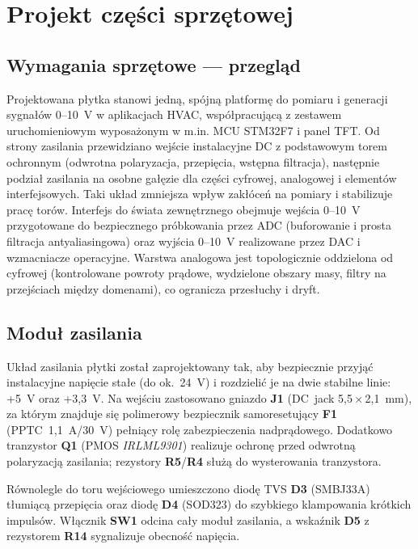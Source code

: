 \section{Projekt części sprzętowej}

\label{sec:wymagania-sprzetowe-przeglad}
\subsection{Wymagania sprzętowe — przegląd}
\label{sec:wymagania-sprzetowe-przeglad}

Projektowana płytka stanowi jedną, spójną platformę do pomiaru i generacji sygnałów 0--10~V w aplikacjach HVAC, współpracującą z zestawem uruchomieniowym wyposażonym w m.in. MCU STM32F7 i panel TFT. Od strony zasilania przewidziano wejście instalacyjne DC z podstawowym torem ochronnym (odwrotna polaryzacja, przepięcia, wstępna filtracja), następnie podział zasilania na osobne gałęzie dla części cyfrowej, analogowej i elementów interfejsowych. Taki układ zmniejsza wpływ zakłóceń na pomiary i stabilizuje pracę torów. Interfejs do świata zewnętrznego obejmuje wejścia 0--10~V przygotowane do bezpiecznego próbkowania przez ADC (buforowanie i prosta filtracja antyaliasingowa) oraz wyjścia 0--10~V realizowane przez DAC i wzmacniacze operacyjne. Warstwa analogowa jest topologicznie oddzielona od cyfrowej (kontrolowane powroty prądowe, wydzielone obszary masy, filtry na przejściach między domenami), co ogranicza przesłuchy i dryft.


\subsection{Moduł zasilania}


Układ zasilania płytki został zaprojektowany tak, aby bezpiecznie przyjąć instalacyjne napięcie stałe (do ok.~24~V) i rozdzielić je na dwie stabilne linie: \mbox{+5~V} oraz \mbox{+3{,}3~V}. Na wejściu zastosowano gniazdo \textbf{J1} (DC~jack 5{,}5\,$\times$\,2{,}1~mm), za którym znajduje się polimerowy bezpiecznik samoresetujący \textbf{F1} (PPTC~1{,}1~A/30~V) pełniący rolę zabezpieczenia nadprądowego. Dodatkowo tranzystor \textbf{Q1} (PMOS \textit{IRLML9301}) realizuje ochronę przed odwrotną polaryzacją zasilania; rezystory \textbf{R5}/\textbf{R4} służą do wysterowania tranzystora.

Równolegle do toru wejściowego umieszczono diodę TVS \textbf{D3} (SMBJ33A) tłumiącą przepięcia oraz diodę \textbf{D4} (SOD323) do szybkiego klampowania krótkich impulsów. Włącznik \textbf{SW1} odcina cały moduł zasilania, a wskaźnik \textbf{D5} z rezystorem \textbf{R14} sygnalizuje obecność napięcia.

